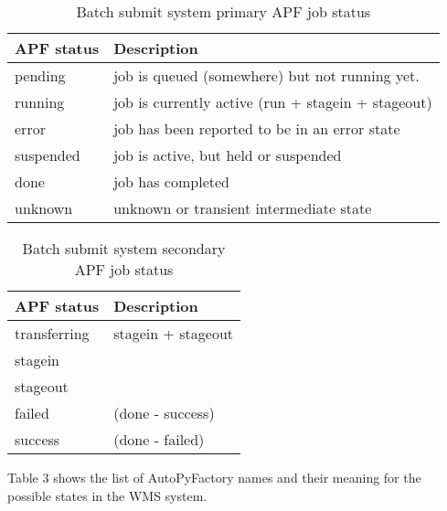 \documentclass[a4paper]{jpconf}
\begin{document}
\begin{table}
   \begin{center}
      \begin{tabular}{l l}
         \hline
         \textbf{APF status} & \textbf{Description} \\ 
         \hline
         pending      &     job is queued (somewhere) but not running yet.      \\  
         running      &     job is currently active (run + stagein + stageout)  \\ 
         error        &     job has been reported to be in an error state       \\ 
         suspended    &     job is active, but held or suspended                \\ 
         done         &     job has completed                                   \\ 
         unknown      &     unknown or transient intermediate state             \\ 
         \hline
      \end{tabular}
   \end{center}
   \caption{Batch submit system primary APF job status}
   \label{job secondary status}
\end{table}

\begin{table}
   \begin{center}
      \begin{tabular}{l l}
         \hline
         \textbf{APF status} & \textbf{Description}  \\ 
         \hline
         transferring  &     stagein + stageout  \\ 
         stagein       &                         \\ 
         stageout      &                         \\ 
         failed        &     (done - success)    \\ 
         success       &     (done - failed)     \\ 
         \hline
      \end{tabular}
   \end{center}
   \caption{Batch submit system secondary APF job status} 
   \label{job secondary status}
\end{table}

Table 3 shows the list of AutoPyFactory names and their meaning 
for the possible states in the WMS system.
\end{document}
